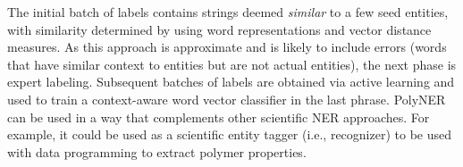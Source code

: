 The initial batch of labels contains strings deemed \textit{similar} to a few seed entities, 
with similarity determined by using word representations and vector distance measures.
As this approach is approximate and is likely to include errors 
(words that have similar context to entities but are not actual entities), the next phase is expert labeling. 
Subsequent batches of labels are obtained via active learning and used 
 to train a context-aware word vector classifier in the last phrase.
PolyNER can be used in a way that complements other scientific NER approaches. 
For example, it could be used as a scientific entity tagger (i.e., recognizer) to be used with data programming to extract polymer properties.

